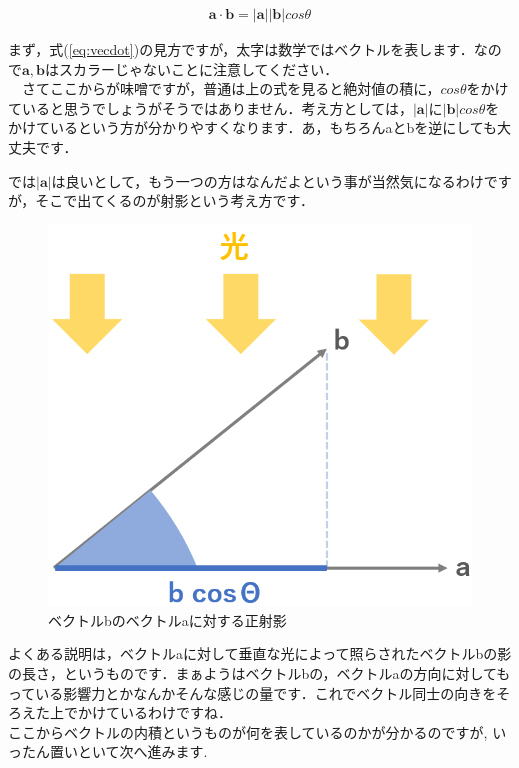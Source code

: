 \documentclass[11pt,a4paper]{jreport}
\begin{document}
\begin{eqnarray}
\label{eq:vecdot}
\mathbf{a}\cdot \mathbf{b} = |\mathbf{a}||\mathbf{b}|cos\theta
\end{eqnarray}

まず，式(\ref{eq:vecdot})の見方ですが，太字は数学ではベクトルを表します．なので$\mathbf{a, b}$はスカラーじゃないことに注意してください．\\
　さてここからが味噌ですが，普通は上の式を見ると絶対値の積に，$cos\theta$をかけていると思うでしょうがそうではありません．考え方としては，$|\mathbf{a}|$に$|\mathbf{b}|cos\theta$をかけているという方が分かりやすくなります．あ，もちろんaとbを逆にしても大丈夫です．

では$|\mathbf{a}|$は良いとして，もう一つの方はなんだよという事が当然気になるわけですが，そこで出てくるのが射影という考え方です．

\begin{figure}[H]
\label{im:shadow}
  \centering
  \includegraphics[width=120mm,bb=0 0 687 618]{../figures/shadow.png}
  \caption{ベクトルbのベクトルaに対する正射影}
\end{figure}

よくある説明は，ベクトルaに対して垂直な光によって照らされたベクトルbの影の長さ，というものです．まぁようはベクトルbの，ベクトルaの方向に対してもっている影響力とかなんかそんな感じの量です．これでベクトル同士の向きをそろえた上でかけているわけですね．\\

ここからベクトルの内積というものが何を表しているのかが分かるのですが, いったん置いといて次へ進みます.\\
\end{document}
